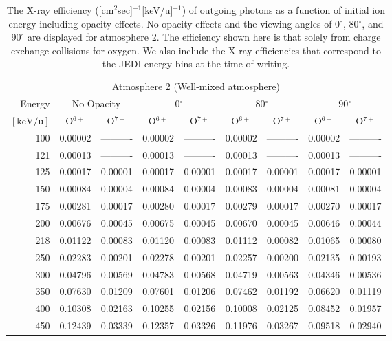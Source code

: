 \begin{table}[ht]
    \centering
    \caption{The X-ray efficiency ([cm$^2$sec]$^{-1}$[keV/u]$^{-1}$) of outgoing photons as a function of initial ion energy including opacity effects. No opacity effects and the viewing angles of 0$^\circ$, 80$^\circ$, and 90$^\circ$ are displayed for atmosphere 2. The efficiency shown here is that solely from charge exchange collisions for oxygen. We also include the X-ray efficiencies that correspond to the JEDI energy bins at the time of writing.}
    \begin{tabular}{r|c|c|c|c|c|c|c|c}
    \multicolumn{9}{c}{Atmosphere 2 (Well-mixed atmosphere)} \\ \cline{2-9}
    Energy & \multicolumn{2}{c|}{No Opacity} & \multicolumn{2}{c|}{0$^\circ$} & \multicolumn{2}{c|}{80$^\circ$} & \multicolumn{2}{c}{90$^\circ$} \\ \cline{2-9}
    $\mathrm{[keV/u]}$ & O$^{6+}$ & O$^{7+}$ & O$^{6+}$ & O$^{7+}$ & O$^{6+}$ & O$^{7+}$ & O$^{6+}$ & O$^{7+}$ \\ \cline{1-9}
      100 & 0.00002 & ---------- & 0.00002 & ---------- & 0.00002 & ---------- & 0.00002 & ---------- \\
      121 & 0.00013 & ---------- & 0.00013 & ---------- & 0.00013 & ---------- & 0.00013 & ---------- \\
      125 & 0.00017 & 0.00001 & 0.00017 & 0.00001 & 0.00017 & 0.00001 & 0.00017 & 0.00001 \\
      150 & 0.00084 & 0.00004 & 0.00084 & 0.00004 & 0.00083 & 0.00004 & 0.00081 & 0.00004 \\
      175 & 0.00281 & 0.00017 & 0.00280 & 0.00017 & 0.00279 & 0.00017 & 0.00270 & 0.00017 \\
      200 & 0.00676 & 0.00045 & 0.00675 & 0.00045 & 0.00670 & 0.00045 & 0.00646 & 0.00044 \\
      218 & 0.01122 & 0.00083 & 0.01120 & 0.00083 & 0.01112 & 0.00082 & 0.01065 & 0.00080 \\
      250 & 0.02283 & 0.00201 & 0.02278 & 0.00201 & 0.02257 & 0.00200 & 0.02135 & 0.00193 \\
      300 & 0.04796 & 0.00569 & 0.04783 & 0.00568 & 0.04719 & 0.00563 & 0.04346 & 0.00536 \\
      350 & 0.07630 & 0.01209 & 0.07601 & 0.01206 & 0.07462 & 0.01192 & 0.06620 & 0.01119 \\
      400 & 0.10308 & 0.02163 & 0.10255 & 0.02156 & 0.10008 & 0.02125 & 0.08452 & 0.01957 \\
      450 & 0.12439 & 0.03339 & 0.12357 & 0.03326 & 0.11976 & 0.03267 & 0.09518 & 0.02940 \\

\end{tabular}
\end{table}
